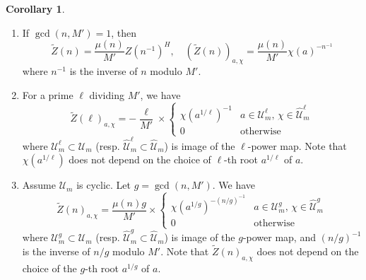 \documentclass[10pt,reqno]{amsproc}
\newcommand{\what}[1]{\widehat{#1}}
\newcommand{\scU}{\mathscr{U}}
\newcommand{\1}{\mathds{1}}	%
\theoremstyle{definition}
\newtheorem{corollary}[theorem]{Corollary}
\theoremstyle{remark}
\begin{document}
\begin{corollary}
    \label{cor:Ztilde}
    \begin{enumerate}
        \item If \(\gcd(n, M') = 1\), then
        \begin{equation}
        \label{eqn:Ztildecoprime}
            \widetilde{Z}(n) = \frac{\mu(n)}{M'} Z(n^{-1})^{H}, \quad (\widetilde{Z}(n))_{a, \chi} = \frac{\mu(n)}{M'} \chi(a)^{-n^{-1}}
        \end{equation}
        where \(n^{-1}\) is the inverse of \(n\) modulo \(M'\).
        \item For a prime \(\ell\) dividing \(M'\), we have
        \begin{equation}
        \label{eqn:Ztildeprimediv}
            \widetilde{Z}(\ell)_{a, \chi} = -\frac{\ell}{M'} \times \begin{cases} \chi(a^{1/\ell})^{-1} & a \in \scU_m^\ell, \, \chi \in \what{\scU}_m^\ell \\ 0 & \text{otherwise} \end{cases}
        \end{equation}
        where $\scU_m^\ell \subset \scU_m$ (resp. $\what{\scU}_m^\ell \subset \what{\scU}_m$) is image of the $\ell$-power map.
        Note that $\chi(a^{1/\ell})$ does not depend on the choice of $\ell$-th root $a^{1/\ell}$ of $a$.
        \item Assume $\scU_m$ is cyclic. Let $g = \gcd(n, M')$. We have
        \begin{equation}
        \label{eqn:Ztildecyclic}
            \widetilde{Z}(n)_{a, \chi} = \frac{\mu(n)g}{M'} \times \begin{cases} 
            \chi(a^{1/g})^{-(n/g)^{-1}} & a \in \scU_m^g, \, \chi \in \what{\scU}_m^g \\ 0 & \text{otherwise}
            \end{cases}
        \end{equation}
        where $\scU_m^g \subset \scU_m$ (resp. $\what{\scU}_m^g \subset \what{\scU}_m$) is image of the $g$-power map, and $(n/g)^{-1}$ is the inverse of $n/g$ modulo $M'$.
        Note that $\widetilde{Z}(n)_{a, \chi}$ does not depend on the choice of the $g$-th root $a^{1/g}$ of $a$.
    \end{enumerate}
\end{corollary}
\end{document}
